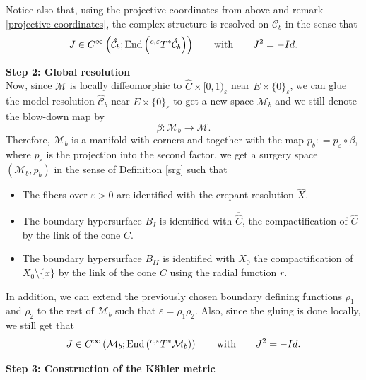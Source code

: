 \documentclass[a4paper,11pt]{article}
\begin{document}
Notice also  that, using the projective coordinates from above and remark \ref{projective coordinates}, the complex structure is resolved on $\mathcal{C}_b$ in the sense that 
$$
J \in C^\infty \left( \hat{\mathcal{C}_b} ; \mathrm{End}\left(\hspace{0.01cm} ^{c,\varepsilon} T^{*} \hat{\mathcal{C}}_b \right)  \right) \hspace{0.7cm} \text{with} \hspace{0.7cm} J^2 = -Id.
$$



\textbf{Step 2: Global resolution}\\

Now, since $\mathcal{M}$ is locally diffeomorphic to $\hat C \times [0,1)_\varepsilon$ near $E \times \{ 0\}_\varepsilon$, we can glue the model resolution $\hat{\mathcal{C}}_b$ near $E \times \{0\}_\varepsilon$ to get a new space ${\mathcal{M}}_b$ and we still denote the blow-down map by
$$
\beta : \mathcal{M}_b \rightarrow \mathcal{M}.
$$
Therefore, $\mathcal{M}_b$ is a manifold with corners and together with the map $ p_b : = p_\varepsilon \circ \beta$, where $p_\varepsilon$ is the projection into the second factor, we get a surgery space $(\mathcal{M}_b, p_b)$ in the sense of Definition \ref{srg} such that 
\begin{itemize}
    \item The fibers over $\varepsilon >0$ are identified with the crepant resolution $\hat{X}$.
    \item The boundary hypersurface $B_I$ is identified with $\overline{\hat{C}}$, the compactification of $\hat C$ by the link of the cone $C$.
    \item The boundary hypersurface $B_{II}$ is identified with $\overline{X_0}$ the compactification of $X_0 \setminus \{ x\}$ by the link of the cone $C$ using the radial function $r$.
\end{itemize}
In addition, we can extend the previously chosen boundary defining functions $\rho_1$ and $\rho_2$ to the rest of $\mathcal{M}_b$ such that $\varepsilon = \rho_1 \rho_2 $. Also, since the gluing is done locally, we still get that
$$
J \in C^\infty \left( \mathcal{M}_b; \mathrm{End}\left(\hspace{0.01cm} ^{c,\varepsilon} T^{*} \mathcal{M}_b \right)  \right)\hspace{0.7cm} \text{with} \hspace{0.7cm} J^2 = -Id.
$$

\textbf{Step 3: Construction of the Kähler metric}\\
\end{document}
